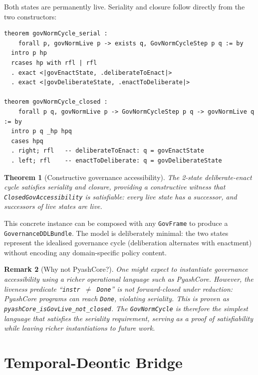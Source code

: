 \documentclass[]{article}
\newtheorem{theorem}{Theorem}
\newtheorem{remark}[theorem]{Remark}
\newcommand{\code}[1]{\texttt{#1}}
\begin{document}
\noindent
Both states are permanently live.  Seriality and closure follow directly from
the two constructors:

\begin{lstlisting}
theorem govNormCycle_serial :
    forall p, govNormLive p -> exists q, GovNormCycleStep p q := by
  intro p hp
  rcases hp with rfl | rfl
  . exact <|govEnactState, .deliberateToEnact|>
  . exact <|govDeliberateState, .enactToDeliberate|>

theorem govNormCycle_closed :
    forall p q, govNormLive p -> GovNormCycleStep p q -> govNormLive q := by
  intro p q _hp hpq
  cases hpq
  . right; rfl   -- deliberateToEnact: q = govEnactState
  . left; rfl    -- enactToDeliberate: q = govDeliberateState
\end{lstlisting}

\begin{theorem}[Constructive governance accessibility]
The 2-state deliberate-enact cycle satisfies seriality and closure,
providing a constructive witness that \code{ClosedGovAccessibility}
is satisfiable: every live state has a successor, and successors of
live states are live.
\end{theorem}

\noindent
This concrete instance can be composed with any \code{GovFrame} to produce a
\code{GovernanceDDLBundle}.  The model is deliberately minimal: the two states
represent the idealised governance cycle (deliberation alternates with
enactment) without encoding any domain-specific policy content.

\begin{remark}[Why not PyashCore?]
One might expect to instantiate governance accessibility using a richer
operational language such as PyashCore.  However, the liveness predicate
``\code{instr $\neq$ Done}'' is \emph{not} forward-closed under reduction:
PyashCore programs can reach \code{Done}, violating seriality.
This is proven as \code{pyashCore\_isGovLive\_not\_closed}.
The \code{GovNormCycle} is therefore the simplest language that satisfies
the seriality requirement, serving as a proof of satisfiability while
leaving richer instantiations to future work.
\end{remark}

\section{Temporal-Deontic Bridge}
\label{sec:temporal}
\end{document}

